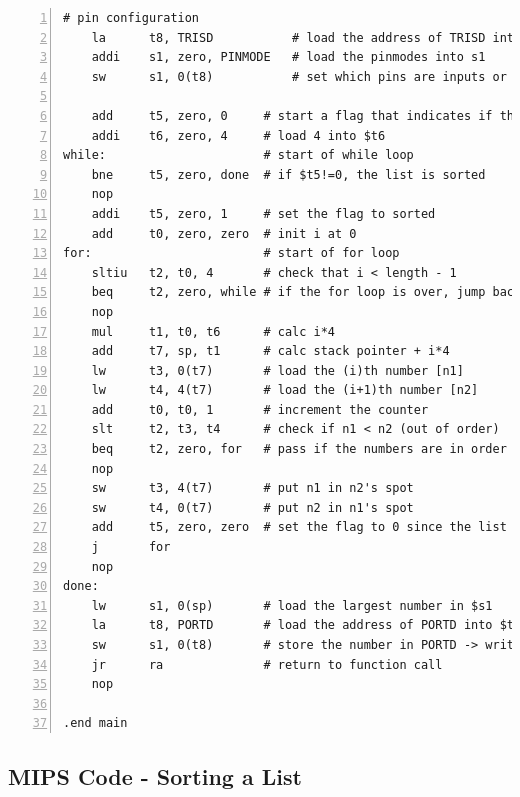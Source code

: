 \documentclass[11pt]{article}
\begin{document}
\begin{lstlisting}[numbers=left,basicstyle=\footnotesize]
    # pin configuration
    la      t8, TRISD           # load the address of TRISD into t8
    addi    s1, zero, PINMODE   # load the pinmodes into s1
    sw      s1, 0(t8)           # set which pins are inputs or outputs.

    add     t5, zero, 0     # start a flag that indicates if the list is sorted.
    addi    t6, zero, 4     # load 4 into $t6
while:                      # start of while loop
    bne     t5, zero, done  # if $t5!=0, the list is sorted
    nop
    addi    t5, zero, 1     # set the flag to sorted
    add     t0, zero, zero  # init i at 0 
for:                        # start of for loop
    sltiu   t2, t0, 4       # check that i < length - 1
    beq     t2, zero, while # if the for loop is over, jump back to the while loop
    nop
    mul     t1, t0, t6      # calc i*4
    add     t7, sp, t1      # calc stack pointer + i*4
    lw      t3, 0(t7)       # load the (i)th number [n1]
    lw      t4, 4(t7)       # load the (i+1)th number [n2]
    add     t0, t0, 1       # increment the counter
    slt     t2, t3, t4      # check if n1 < n2 (out of order)
    beq     t2, zero, for   # pass if the numbers are in order ($t2=0)
    nop
    sw      t3, 4(t7)       # put n1 in n2's spot
    sw      t4, 0(t7)       # put n2 in n1's spot
    add     t5, zero, zero  # set the flag to 0 since the list is not sorted
    j       for
    nop
done:
    lw      s1, 0(sp)       # load the largest number in $s1
    la      t8, PORTD       # load the address of PORTD into $t8
    sw      s1, 0(t8)       # store the number in PORTD -> write to LEDs
    jr      ra              # return to function call
    nop

.end main
\end{lstlisting}


\subsection{MIPS Code - Sorting a List}
\end{document}
